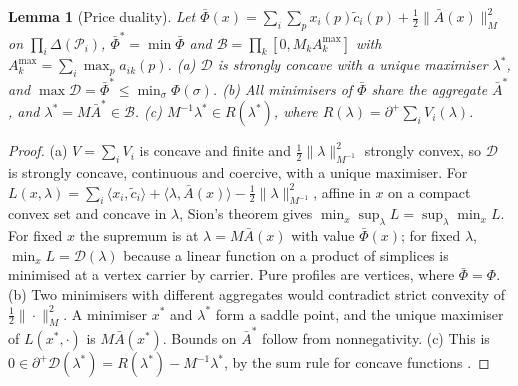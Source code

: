 \documentclass[preprint,12pt]{elsarticle}
\newtheorem{lemma}[theorem]{Lemma}
\theoremstyle{definition}
\theoremstyle{remark}
\newcommand{\cP}{\mathcal{P}}
\newcommand{\Abar}{\bar A}
\newcommand{\Amax}{A^{\max}}
\newcommand{\ip}[2]{\langle #1,#2\rangle}
\newcommand{\sd}{\partial^{+}}
\begin{document}
\begin{lemma}[Price duality]\label{lem:dual}
Let $\bar\Phi(x)=\sum_i\sum_px_i(p)\tilde c_i(p)+\tfrac12\|\Abar(x)\|_M^2$ on $\prod_i\Delta(\cP_i)$, $\bar\Phi^*=\min\bar\Phi$ and $\mathcal B=\prod_k[0,M_k\Amax_k]$ with $\Amax_k=\sum_i\max_pa_{ik}(p)$. (a) $\mathcal D$ is strongly concave with a unique maximiser $\lambda^*$, and $\max\mathcal D=\bar\Phi^*\le\min_\sigma\Phi(\sigma)$. (b) All minimisers of $\bar\Phi$ share the aggregate $\Abar^*$, and $\lambda^*=M\Abar^*\in\mathcal B$. (c) $M^{-1}\lambda^*\in R(\lambda^*)$, where $R(\lambda)=\sd\sum_iV_i(\lambda)$.
\end{lemma}
\begin{proof}
(a) $V=\sum_iV_i$ is concave and finite and $\tfrac12\|\lambda\|^2_{M^{-1}}$ strongly convex, so $\mathcal D$ is strongly concave, continuous and coercive, with a unique maximiser. For $L(x,\lambda)=\sum_i\ip{x_i}{\tilde c_i}+\ip{\lambda}{\Abar(x)}-\tfrac12\|\lambda\|^2_{M^{-1}}$, affine in $x$ on a compact convex set and concave in $\lambda$, Sion's theorem gives $\min_x\sup_\lambda L=\sup_\lambda\min_xL$. For fixed $x$ the supremum is at $\lambda=M\Abar(x)$ with value $\bar\Phi(x)$; for fixed $\lambda$, $\min_xL=\mathcal D(\lambda)$ because a linear function on a product of simplices is minimised at a vertex carrier by carrier. Pure profiles are vertices, where $\bar\Phi=\Phi$. (b) Two minimisers with different aggregates would contradict strict convexity of $\tfrac12\|\cdot\|_M^2$. A minimiser $x^*$ and $\lambda^*$ form a saddle point, and the unique maximiser of $L(x^*,\cdot)$ is $M\Abar(x^*)$. Bounds on $\Abar^*$ follow from nonnegativity. (c) This is $0\in\sd\mathcal D(\lambda^*)=R(\lambda^*)-M^{-1}\lambda^*$, by the sum rule for concave functions \citep{Rockafellar1970}.
\end{proof}
\end{document}
